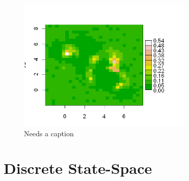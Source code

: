 \begin{figure}
\begin{center}
\includegraphics[height=2.5in]{figs/densitymap2}
\end{center}
\caption{Needs a caption}
\label{fig.densitymap2}
\end{figure}

\section{Discrete State-Space}
\label{scr0.sec.discrete}

